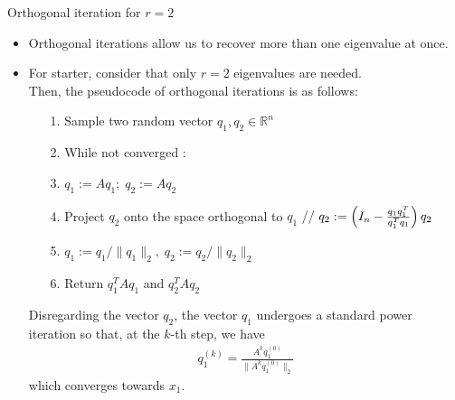 \documentclass[t,usepdftitle=false]{beamer}
\begin{document}
\begin{frame}{Orthogonal iteration for $r=2$}
\begin{itemize}
\item Orthogonal iterations allow us to recover more than one eigenvalue at once.
\item For starter, consider that only $r=2$ eigenvalues are needed.\vspace{.1cm}\\
Then, the pseudocode of orthogonal iterations is as follows:\vspace{.2cm}
\begin{itemize}\normalsize
\item[1.] Sample two random vector $q_1,q_2\in\mathbb{R}^n$\vspace{.07cm}
\item[2.] While not converged :\vspace{.07cm}
\item[3.]\hspace{.4cm}$q_1:=Aq_1;\;q_2:=Aq_2$\vspace{.07cm}
\item[4.]\hspace{.4cm}Project $q_2$ onto the space orthogonal to $q_1$ {\color{gray}// $q_2:=\left(I_n-\frac{q_1q_1^T}{q_1^Tq_1}\right)q_2\hspace{-2cm}$}\vspace{.07cm}
\item[5.]\hspace{.4cm}$q_1:=q_1/\|q_1\|_2,\;q_2:=q_2/\|q_2\|_2$\vspace{.07cm}
\item[6.] Return $q_1^TAq_1$ and $q_2^TAq_2$\vspace{.2cm}
\end{itemize}
Disregarding the vector $q_2$, the vector $q_1$ undergoes a standard power iteration so that, at the $k$-th step, we have
\begin{align*}
q_1^{(k)}=\frac{A^kq_1^{(0)}}{\|A^kq_1^{(0)}\|_2}
\end{align*}
which converges towards $x_1$.
\end{itemize}
\end{frame}
\end{document}
